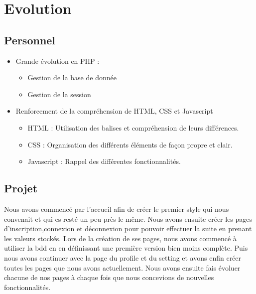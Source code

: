 \documentclass[12pt,a4paper]{article}
\begin{document}
\section{Evolution}
\subsection{Personnel}

\begin{itemize}
    
  \item Grande évolution en PHP :
    \begin{itemize}
        
    \item Gestion de la base de donnée
    \item Gestion de la session
      
    \end{itemize}
    
  \item Renforcement de la compréhension de HTML, CSS et Javascript
    \begin{itemize}
        
    \item HTML : Utilisation des balises et compréhension de leurs différences.
    \item CSS : Organisation des différents éléments de façon propre et clair.
    \item Javascript : Rappel des différentes fonctionnalités.
      
    \end{itemize}
  
\end{itemize}

\newpage

\subsection{Projet}

Nous avons commencé par l'accueil afin de créer le premier style qui nous convenait et qui es resté un peu près le même.
Nous avons ensuite créer les pages d'inscription,connexion et déconnexion pour pouvoir effectuer la suite en prenant les valeurs stockés. Lors de la création de ses pages, nous avons commencé à utiliser la bdd en en définissant une première version bien moins complète.
Puis nous avons continuer avec la page du profile et du setting et avons enfin créer toutes les pages que nous avons actuellement. Nous avons ensuite fais évoluer chacune de nos pages à chaque fois que nous concevions de nouvelles fonctionnalités.
\end{document}
